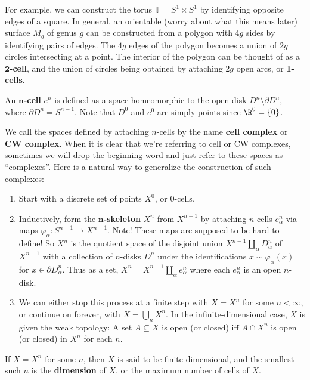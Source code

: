 For example, we can construct the torus $\mathbb{T}=S^1 \times S^1 $ by identifying opposite edges of a square. In general, an orientable (worry about what this means later) surface $M_g$ of genus $g$ can be constructed from a polygon with $4g$ sides by identifying pairs of edges. The $4g $ edges of the polygon becomes a union of $2g$ circles intersecting at a point. The interior of the polygon can be thought of as a $\mathbf 2$\textbf{-cell}, and the union of circles being obtained by attaching $2g$ open arcs, or $\mathbf 1$\textbf{-cells}. 
\begin{definition}[$n$-cell]
An $\mathbf{n}$\textbf{-cell} $e^n $ is defined as a space homeomorphic to the open disk $D^n \setminus \partial D^n,$ where $\partial D^n =S^{n-1}$. Note that $D^0$ and $e^0$ are simply points since $\R^0=\{0\} $.
\end{definition}
\begin{definition}[CW complexes]
We call the spaces defined by attaching $n$-cells by the name \textbf{cell complex} or \textbf{CW complex}. When it is clear that we're referring to cell or CW complexes, sometimes we will drop the beginning word and just refer to these spaces as ``complexes''. Here is a natural way to generalize the construction of such complexes:
\begin{enumerate}[label=(\arabic*)]
    \item Start with a discrete set of points $X^0$, or $0$-cells.
    \item Inductively, form the $\mathbf n$\textbf{-skeleton} $X^n $ from $X^{n-1}$ by attaching $n$-cells $e_{\alpha }^n $ via maps $\varphi _{\alpha }\colon S^{n-1} \to X^{n-1}$. Note! These maps are supposed to be hard to define! So $X^n $ is the quotient space of the disjoint union $X^{n-1}\amalg _{\alpha }D_{\alpha }^n $ of $X^{n-1}$ with a collection of $n$-disks $D^n $ under the identifications $x\sim \varphi _{\alpha }(x)$ for $x\in \partial D_{\alpha }^n $. Thus as a set, $X^n =X^{n-1}\amalg_{\alpha }e_{\alpha }^n $ where each $e_{\alpha }^n $ is an open $n$-disk.
    \item We can either stop this process at a finite step with $X=X^n $ for some $n<\infty$, or continue on forever, with $X=\bigcup_{n} X^n $. In the infinite-dimensional case, $X$ is given the weak topology: A set $A\subseteq X$ is open (or closed) iff $A\cap X^n $ is open (or closed) in $X^n $ for each $n$.
\end{enumerate}
If $X=X^n $ for some $n$, then $X$ is said to be finite-dimensional, and the smallest such $n$ is the \textbf{dimension} of $X$, or the maximum number of cells of $X$.
    
\end{definition}
